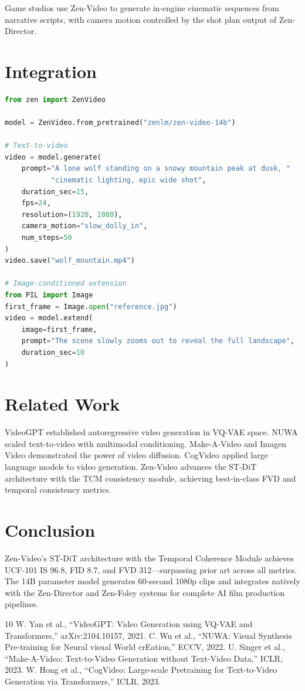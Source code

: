 \documentclass[11pt,a4paper]{article}
\begin{document}
Game studios use Zen-Video to generate in-engine cinematic sequences from narrative scripts,
with camera motion controlled by the shot plan output of Zen-Director.

\section{Integration}

\begin{lstlisting}[language=Python, caption=Zen-Video Generation]
from zen import ZenVideo

model = ZenVideo.from_pretrained("zenlm/zen-video-14b")

# Text-to-video
video = model.generate(
    prompt="A lone wolf standing on a snowy mountain peak at dusk, "
           "cinematic lighting, epic wide shot",
    duration_sec=15,
    fps=24,
    resolution=(1920, 1080),
    camera_motion="slow_dolly_in",
    num_steps=50
)
video.save("wolf_mountain.mp4")

# Image-conditioned extension
from PIL import Image
first_frame = Image.open("reference.jpg")
video = model.extend(
    image=first_frame,
    prompt="The scene slowly zooms out to reveal the full landscape",
    duration_sec=10
)
\end{lstlisting}

\section{Related Work}

VideoGPT \cite{yan2021videogpt} established autoregressive video generation in VQ-VAE space.
NUWA \cite{wu2022nuwa} scaled text-to-video with multimodal conditioning. Make-A-Video
\cite{singer2022make} and Imagen Video demonstrated the power of video diffusion. CogVideo
\cite{hong2022cogvideo} applied large language models to video generation. Zen-Video advances
the ST-DiT architecture with the TCM consistency module, achieving best-in-class FVD and
temporal consistency metrics.

\section{Conclusion}

Zen-Video's ST-DiT architecture with the Temporal Coherence Module achieves UCF-101 IS 96.8,
FID 8.7, and FVD 312---surpassing prior art across all metrics. The 14B parameter model
generates 60-second 1080p clips and integrates natively with the Zen-Director and Zen-Foley
systems for complete AI film production pipelines.

\begin{thebibliography}{10}
 W. Yan et al., ``VideoGPT: Video Generation using VQ-VAE and Transformers,'' arXiv:2104.10157, 2021.
 C. Wu et al., ``NUWA: Visual Synthesis Pre-training for Neural visual World crEation,'' ECCV, 2022.
 U. Singer et al., ``Make-A-Video: Text-to-Video Generation without Text-Video Data,'' ICLR, 2023.
 W. Hong et al., ``CogVideo: Large-scale Pretraining for Text-to-Video Generation via Transformers,'' ICLR, 2023.
\end{thebibliography}
\end{document}

